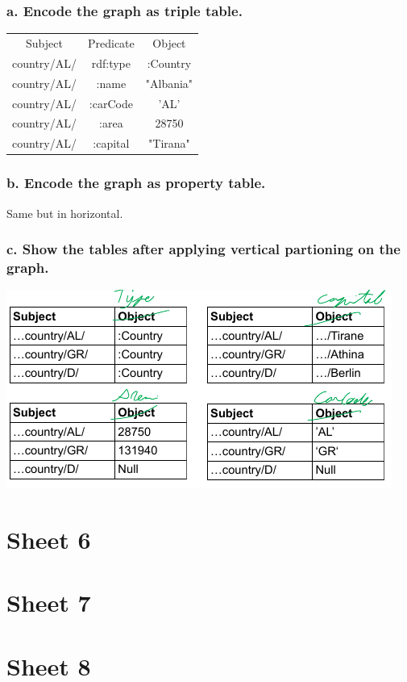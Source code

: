 \documentclass{article}
\begin{document}
\subsubsection{a. Encode the graph as triple table.}

\begin{tabular}{ c c c }
 Subject & Predicate & Object \\ 
 country/AL/ & rdf:type & :Country \\  
 country/AL/ & :name & "Albania"   \\
 country/AL/ & :carCode & 'AL'\\
 country/AL/ & :area & 28750\\
 country/AL/ & :capital & "Tirana"\\
\end{tabular}

\subsubsection{b. Encode the graph as property table.}

Same but in horizontal.

\subsubsection{c. Show the tables after applying vertical partioning on the graph.}

\includegraphics[scale=0.4]{5_7.png}



\section{Sheet 6}
\section{Sheet 7}
\section{Sheet 8}
\end{document}
